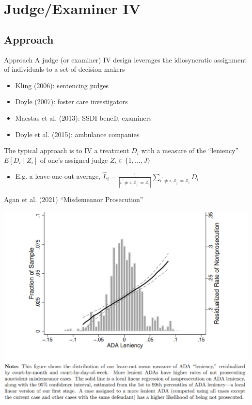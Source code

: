 \documentclass{beamer}
\begin{document}

\section{Judge/Examiner IV}

\subsection{Approach}
\begin{frame}{Approach}
\vspace{-0.2cm}
A judge (or examiner) IV design leverages the idiosyncratic assignment of individuals to a set of decision-makers\smallskip
\begin{itemize}
\item Kling (2006): sentencing judges\smallskip
\item Doyle (2007): foster care investigators\smallskip
\item Maestas et al. (2013): SSDI benefit examiners\smallskip
\item Doyle et al. (2015): ambulance companies
\end{itemize}\bigskip\pause{}
The typical approach is to IV a treatment $D_i$ with a measure of the ``leniency'' $E[D_i\mid Z_{i}]$ of one's assigned judge $Z_i\in\{1,\dots,J\}$\smallskip
\begin{itemize}
\item E.g. a leave-one-out average, $\hat{L}_i=\frac{1}{|i^\prime\neq i,Z_{i^\prime}=Z_i|}\sum_{i^\prime \neq i,Z_{i^\prime}=Z_i}D_i$
\end{itemize}
\end{frame}

\begin{frame}{Agan et al. (2021) ``Misdemeanor Prosecution''}
\begin{center}
\includegraphics[scale=0.55]{./lecture_includes/agan_FS.png}
\end{center}
\end{frame}
\end{document}
